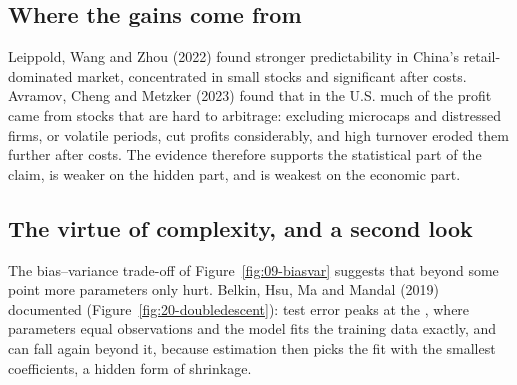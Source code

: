 \subsection{Where the gains come from}

Leippold, Wang and Zhou (2022) found stronger predictability in China's retail-dominated market, concentrated in small stocks and significant after costs. Avramov, Cheng and Metzker (2023) found that in the U.S. much of the profit came from stocks that are hard to arbitrage: excluding microcaps and distressed firms, or volatile periods, cut profits considerably, and high turnover eroded them further after costs. The evidence therefore supports the statistical part of the claim, is weaker on the hidden part, and is weakest on the economic part.

\subsection{The virtue of complexity, and a second look}
\label{sec:20-complexity}

The bias--variance trade-off of Figure~\ref{fig:09-biasvar} suggests that beyond some point more parameters only hurt. Belkin, Hsu, Ma and Mandal (2019) documented  (Figure~\ref{fig:20-doubledescent}): test error peaks at the , where parameters equal observations and the model fits the training data exactly, and can fall again beyond it, because estimation then picks the fit with the smallest coefficients, a hidden form of shrinkage.


